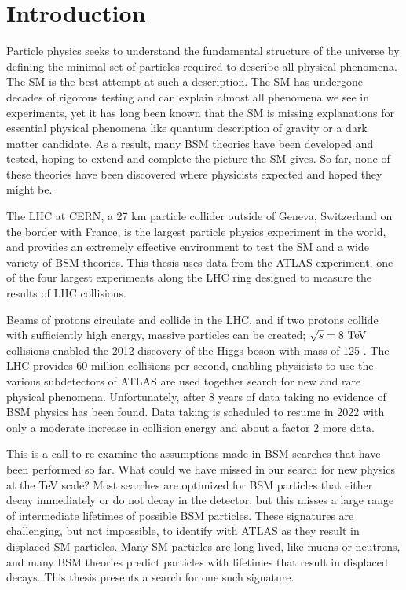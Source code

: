 \chapter{Introduction}

Particle physics seeks to understand the fundamental structure of the universe by defining the minimal set of particles required to describe all physical phenomena. The \acf{SM} is the best attempt at such a description. The \ac{SM} has undergone decades of rigorous testing and can explain almost all phenomena we see in experiments, yet it has long been known that the \ac{SM} is missing explanations for essential physical phenomena like quantum description of gravity or a dark matter candidate. As a result, many \acf{BSM} theories have been developed and tested, hoping to extend and complete the picture the \ac{SM} gives. So far, none of these theories have been discovered where physicists expected and hoped they might be.

The \acf{LHC} at \acf{CERN}, a 27 km particle collider outside of Geneva, Switzerland on the border with France, is the largest particle physics experiment in the world, and provides an extremely effective environment to test the \ac{SM} and a wide variety of \ac{BSM} theories. This thesis uses data from the \acf{ATLAS} experiment, one of the four largest experiments along the \ac{LHC} ring designed to measure the results of \ac{LHC} collisions.

Beams of protons circulate and collide in the \ac{LHC}, and if two protons collide with sufficiently high energy, massive particles can be created; $\sqrt{s} = 8 \TeV$ collisions enabled the 2012 discovery of the Higgs boson with mass of 125 \GeV. The \ac{LHC} provides 60 million collisions per second, enabling physicists to use the various subdetectors of \ac{ATLAS} are used together search for new and rare physical phenomena. Unfortunately, after 8 years of data taking no evidence of \ac{BSM} physics has been found. Data taking is scheduled to resume in 2022 with only a moderate increase in collision energy and about a factor 2 more data. 

This is a call to re-examine the assumptions made in \ac{BSM} searches that have been performed so far. What could we have missed in our search for new physics at the TeV scale? Most searches are optimized for \ac{BSM} particles that either decay immediately or do not decay in the detector, but this misses a large range of intermediate lifetimes of possible \ac{BSM} particles. These signatures are challenging, but not impossible, to identify with \ac{ATLAS} as they result in displaced \ac{SM} particles. Many \ac{SM} particles are long lived, like muons or neutrons, and many \ac{BSM} theories predict particles with lifetimes that result in displaced decays. This thesis presents a search for one such signature.


